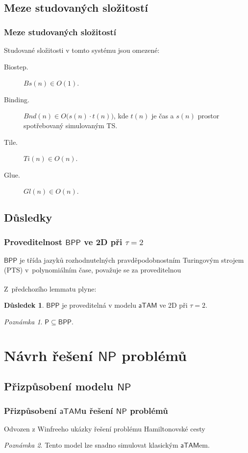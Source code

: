 \documentclass[10pt]{beamer}
\renewcommand{\P}{\mathsf{P}}
\newcommand{\NP}{\mathsf{NP}}
\newcommand{\BPP}{\mathsf{BPP}}
\newcommand{\atam}{\mathsf{aTAM}}
\theoremstyle{definition}
\newtheorem{dusl}[tvr]{Důsledek}
\theoremstyle{remark}
\newtheorem{pozn}{Poznámka}
\begin{document}
\subsection{Meze studovaných složitostí}
\begin{frame}
\frametitle{Meze studovaných složitostí}
	\begin{lemma}
		Studované složitosti v tomto systému jsou omezené:
		\begin{description}
			\item[Biostep.] $Bs(n) \in O(1)$.
			\item[Binding.] $Bnd(n) \in O\bigl(s(n)\cdot t(n)\bigr)$, kde $t(n)$ je čas a $s(n)$ prostor spotřebovaný simulovaným TS.
			\item[Tile.] $Ti(n) \in O(n)$.
			\item[Glue.] $Gl(n) \in O(n)$.
		\end{description}
	\end{lemma}
\end{frame}

\subsection{Důsledky}
\begin{frame}
\frametitle{Proveditelnost $\BPP$ ve 2D při $\tau=2$}
	$\BPP$ je třída jazyků rozhodnutelných pravděpodobnostním Turingovým strojem (PTS) v~polynomiálním čase, považuje se za proveditelnou\\
	~\\
	Z~předchozího lemmatu plyne:
	\begin{dusl}
		$\BPP$ je proveditelná v modelu $\atam$ ve 2D při $\tau=2$.
	\end{dusl}
	\begin{pozn}
		$\P \subseteq \BPP$.
	\end{pozn}
\end{frame}

\section{Návrh řešení $\NP$ problémů}
\subsection{Přizpůsobení modelu $\NP$}
\begin{frame}
\frametitle{Přizpůsobení $\atam$u řešení $\NP$ problémů}
	Odvozen z Winfreeho ukázky řešení problému Hamiltonovské cesty
	\begin{pozn}
		Tento model lze snadno simulovat klasickým $\atam$em.
	\end{pozn}
\end{frame}
\end{document}
